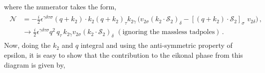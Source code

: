 where the numerator takes the form,
\begin{align}
\begin{split}
    \mathcal{N}&=-\frac{i}{2}\epsilon^{\gamma\delta\tau\sigma}(q+k_2)\cdot k_2(q+k_2)_{\tau}k_{2\gamma}\,\Big(v_{2\sigma}(k_2\cdot \mathcal{S}_2)_{\delta}-[(q+k_2)\cdot \mathcal{S}_2 ]_{\sigma}\,\,v_{2\delta}\Big)\,,\\ &
  \to  \frac{i}{2}\epsilon^{\gamma\delta\tau\sigma}q^2\, q_\tau \,k_{2\gamma} v_{2\sigma}(k_2\cdot \mathcal{S}_2)_{\delta}\,\,(\textrm{ignoring the massless tadpoles})\,.
  \end{split}
\end{align}
Now, doing the $k_2$  and $q$ integral and using the anti-symmetric property of epsilon, it is easy to show that the contribution to the eikonal phase from this diagram is given by,


